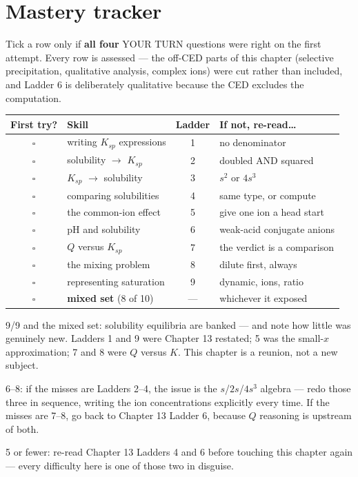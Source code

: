 \documentclass{apchem-worksheet}
\begin{document}
\section*{\sffamily Mastery tracker}

Tick a row only if \textbf{all four} YOUR TURN questions were right on
the first attempt. Every row is assessed --- the off-CED parts of this
chapter (selective precipitation, qualitative analysis, complex ions)
were cut rather than included, and Ladder 6 is deliberately qualitative
because the CED excludes the computation.

\renewcommand{\arraystretch}{1.3}
\noindent\begin{tabular}{@{}c p{5.9cm} c p{4.9cm}@{}}
\toprule
\textbf{First try?} & \textbf{Skill} & \textbf{Ladder} &
  \textbf{If not, re-read\ldots}\\
\midrule
$\square$ & writing $K_{sp}$ expressions & 1 & no denominator \\
$\square$ & solubility $\to$ $K_{sp}$ & 2 & doubled AND squared \\
$\square$ & $K_{sp}$ $\to$ solubility & 3 & $s^{2}$ or $4s^{3}$ \\
$\square$ & comparing solubilities & 4 & same type, or compute \\
$\square$ & the common-ion effect & 5 & give one ion a head start \\
$\square$ & pH and solubility & 6 & weak-acid conjugate anions \\
$\square$ & $Q$ versus $K_{sp}$ & 7 & the verdict is a comparison \\
$\square$ & the mixing problem & 8 & dilute first, always \\
$\square$ & representing saturation & 9 & dynamic, ions, ratio \\
\midrule
$\square$ & \textbf{mixed set} (8 of 10) & --- & whichever it exposed \\
\bottomrule
\end{tabular}

\begin{apcnote}
9/9 and the mixed set: solubility equilibria are banked --- and note
how little was genuinely new. Ladders 1 and 9 were Chapter 13 restated;
5 was the small-$x$ approximation; 7 and 8 were $Q$ versus $K$. This
chapter is a reunion, not a new subject.

6--8: if the misses are Ladders 2--4, the issue is the $s$/$2s$/$4s^{3}$
algebra --- redo those three in sequence, writing the ion
concentrations explicitly every time. If the misses are 7--8, go back
to Chapter 13 Ladder 6, because $Q$ reasoning is upstream of both.

5 or fewer: re-read Chapter 13 Ladders 4 and 6 before touching this
chapter again --- every difficulty here is one of those two in
disguise.
\end{apcnote}
\end{document}
